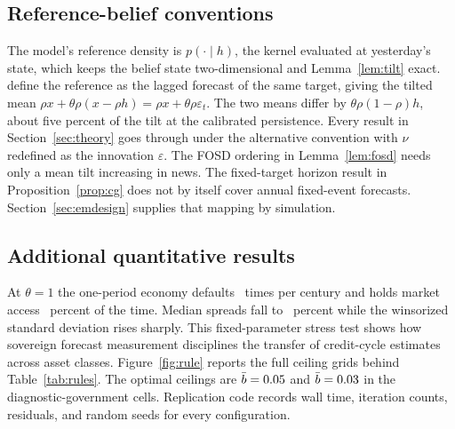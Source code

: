 \documentclass[11pt]{article}
\theoremstyle{definition}
\begin{document}
\subsection{Reference-belief conventions}\label{app:conventions}

The model's reference density is $p(\cdot\mid h)$, the kernel evaluated at yesterday's state, which keeps the belief state two-dimensional and Lemma~\ref{lem:tilt} exact. \citet{BordaloGennaioliMaShleifer2020} define the reference as the lagged forecast of the same target, giving the tilted mean $\rho x+\theta\rho(x-\rho h)=\rho x+\theta\rho\varepsilon_t$. The two means differ by $\theta\rho(1-\rho)h$, about five percent of the tilt at the calibrated persistence. Every result in Section~\ref{sec:theory} goes through under the alternative convention with $\nu$ redefined as the innovation $\varepsilon$. The FOSD ordering in Lemma~\ref{lem:fosd} needs only a mean tilt increasing in news. The fixed-target horizon result in Proposition~\ref{prop:cg} does not by itself cover annual fixed-event forecasts. Section~\ref{sec:emdesign} supplies that mapping by simulation.

\subsection{Additional quantitative results}\label{app:addl}

At $\theta=1$ the one-period economy defaults \DefFreqOne\ times per century and holds market access \FracAccessOne\ percent of the time. Median spreads fall to \SprMedOne\ percent while the winsorized standard deviation rises sharply. This fixed-parameter stress test shows how sovereign forecast measurement disciplines the transfer of credit-cycle estimates across asset classes. Figure~\ref{fig:rule} reports the full ceiling grids behind Table~\ref{tab:rules}. The optimal ceilings are $\bar b=0.05$ and $\bar b=0.03$ in the diagnostic-government cells. Replication code records wall time, iteration counts, residuals, and random seeds for every configuration.

\clearpage
\printbibliography
\end{document}
